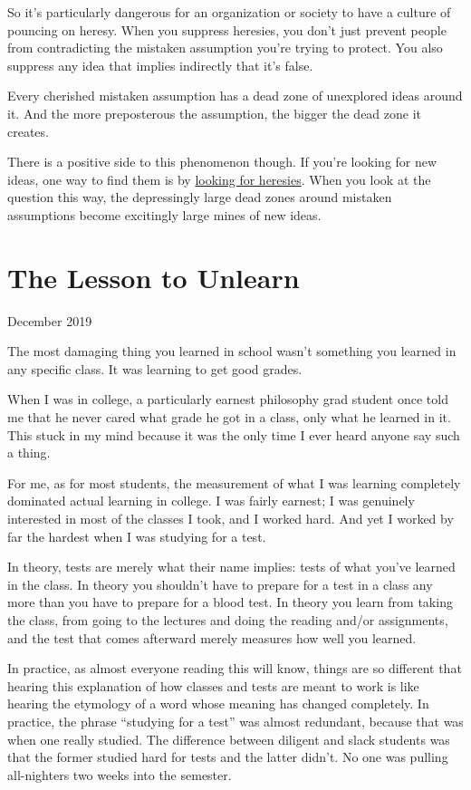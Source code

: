 \documentclass[12pt]{book}
\begin{document}
So it's particularly dangerous for an organization or society to have a
culture of pouncing on heresy. When you suppress heresies, you don't
just prevent people from contradicting the mistaken assumption you're
trying to protect. You also suppress any idea that implies indirectly
that it's false.

Every cherished mistaken assumption has a dead zone of unexplored ideas
around it. And the more preposterous the assumption, the bigger the dead
zone it creates.

There is a positive side to this phenomenon though. If you're looking
for new ideas, one way to find them is by \href{say.html}{looking for
heresies}. When you look at the question this way, the depressingly
large dead zones around mistaken assumptions become excitingly large
mines of new ideas.
\chapter{The Lesson to Unlearn}

December 2019

The most damaging thing you learned in school wasn't something you
learned in any specific class. It was learning to get good grades.

When I was in college, a particularly earnest philosophy grad student
once told me that he never cared what grade he got in a class, only what
he learned in it. This stuck in my mind because it was the only time I
ever heard anyone say such a thing.

For me, as for most students, the measurement of what I was learning
completely dominated actual learning in college. I was fairly earnest; I
was genuinely interested in most of the classes I took, and I worked
hard. And yet I worked by far the hardest when I was studying for a
test.

In theory, tests are merely what their name implies: tests of what
you've learned in the class. In theory you shouldn't have to prepare for
a test in a class any more than you have to prepare for a blood test. In
theory you learn from taking the class, from going to the lectures and
doing the reading and/or assignments, and the test that comes afterward
merely measures how well you learned.

In practice, as almost everyone reading this will know, things are so
different that hearing this explanation of how classes and tests are
meant to work is like hearing the etymology of a word whose meaning has
changed completely. In practice, the phrase ``studying for a test'' was
almost redundant, because that was when one really studied. The
difference between diligent and slack students was that the former
studied hard for tests and the latter didn't. No one was pulling
all-nighters two weeks into the semester.
\end{document}
